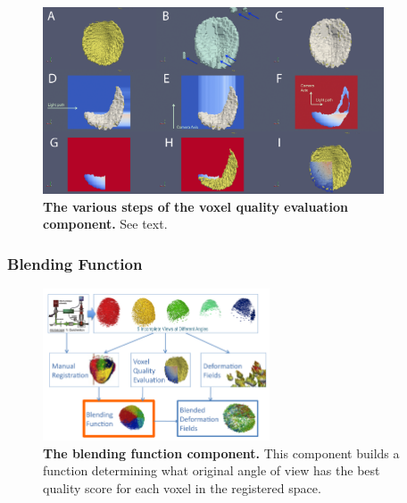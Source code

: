 \begin{figure}
\begin{center}
\includegraphics[width=0.9\textwidth]{../../images/Reconstruction/washington/vqe_letter.png}
\end{center}
\caption{\textbf{The various steps of the voxel quality evaluation component.} See text.}
\label{washington_vqe}
\end{figure}

\subsubsection{Blending Function  }
\begin{figure}
\begin{center}
\includegraphics[width=0.6\textwidth]{../../images/Reconstruction/washington/workflow_blend_corrected.png}
\end{center}
\caption{\textbf{The blending function component.} This component builds a function determining what original angle of view has the best quality score for each voxel in the registered space.}
\label{washington_workflow_blend}
\end{figure}

